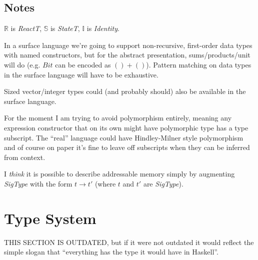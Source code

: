 \documentclass{article}[11pt]
\begin{document}
\subsection{Notes}
$\mathbb{R}$ is {\it ReactT}, $\mathbb{S}$ is {\it StateT}, $\mathbb{I}$ is {\it Identity}.

In a surface language we're going to support non-recursive, first-order data types with named constructors, but for the abstract presentation, sums/products/unit will do (e.g. $Bit$ can be encoded as $() + ()$). Pattern matching on data types in the surface language will have to be exhaustive.

Sized vector/integer types could (and probably should) also be available in the surface language.

For the moment I am trying to avoid polymorphism entirely, meaning any expression constructor that on its own might have polymorphic type has a type subscript. The ``real'' language could have Hindley-Milner style polymorphism and of course on paper it's fine to leave off subscripts when they can be inferred from context.

I {\em think} it is possible to describe addressable memory simply by augmenting {\it SigType} with the form $t \rightarrow t'$ (where $t$ and $t'$ are {\it SigType}).

\section{Type System}

THIS SECTION IS OUTDATED, but if it were not outdated it would reflect the simple slogan that ``everything has the type it would have in Haskell''.
\end{document}
